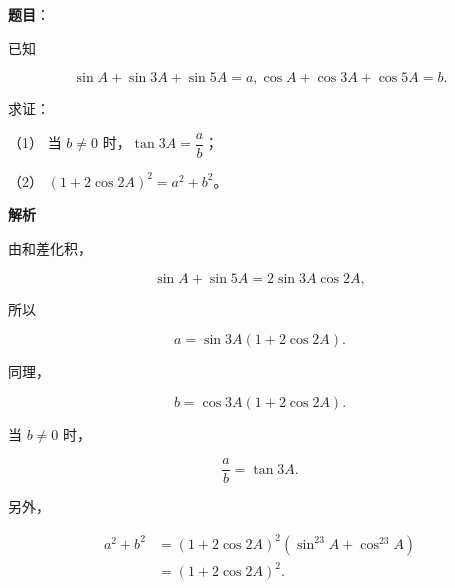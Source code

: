 \begin{answer}

\textbf{题目}：

已知

\nopagebreak[4]
\[
\sin A+\sin3A+\sin5A=a,
\cos A+\cos3A+\cos5A=b.
\]

求证：

（1） 当 $b\ne0$ 时，$\tan3A=\dfrac ab$；

（2） $(1+2\cos2A)^2=a^2+b^2$。

\textbf{解析}


由和差化积，

\nopagebreak[4]
\[
\sin A+\sin5A=2\sin3A\cos2A,
\]

所以

\nopagebreak[4]
\[
a=\sin3A(1+2\cos2A).
\]

同理，

\nopagebreak[4]
\[
b=\cos3A(1+2\cos2A).
\]

当 $b\ne0$ 时，

\nopagebreak[4]
\[
\frac ab=\tan3A.
\]


另外，

\nopagebreak[4]
\[
\begin{aligned}
a^2+b^2
&=(1+2\cos2A)^2(\sin^23A+\cos^23A)\\
&=(1+2\cos2A)^2.
\end{aligned}
\]



\end{answer}
